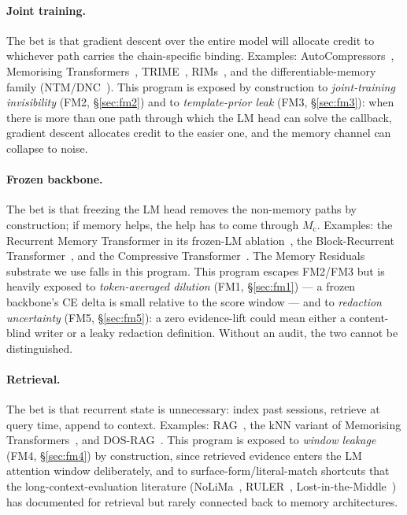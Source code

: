 \documentclass{article}
\newcommand{\Mc}{M_{\mathrm{c}}}
\begin{document}
\paragraph{Joint training.}  The bet is that gradient descent over
the entire model will allocate credit to whichever path carries the
chain-specific binding.  Examples: AutoCompressors~\cite{autocompressors2023},
Memorising Transformers~\cite{memorizing2022}, TRIME~\cite{trime2022},
RIMs~\cite{rims2021}, and the differentiable-memory family
(NTM/DNC~\cite{ntm2014}).  This program is exposed by construction to
\emph{joint-training invisibility} (FM2, \S\ref{sec:fm2}) and to
\emph{template-prior leak} (FM3, \S\ref{sec:fm3}): when there is more
than one path through which the LM head can solve the callback,
gradient descent allocates credit to the easier one, and the memory
channel can collapse to noise.

\paragraph{Frozen backbone.}  The bet is that freezing the LM head
removes the non-memory paths by construction; if memory helps, the
help has to come through $\Mc$.  Examples: the Recurrent Memory
Transformer in its frozen-LM ablation~\cite{rmt2022,armt2024}, the
Block-Recurrent Transformer~\cite{blockrecurrent2022}, and the
Compressive Transformer~\cite{compressive2019}.  The Memory Residuals
substrate we use falls in this program.  This program escapes FM2/FM3
but is heavily exposed to \emph{token-averaged dilution} (FM1,
\S\ref{sec:fm1}) --- a frozen backbone's CE delta is small relative
to the score window --- and to \emph{redaction uncertainty} (FM5,
\S\ref{sec:fm5}): a zero evidence-lift could mean either a
content-blind writer or a leaky redaction definition.  Without an
audit, the two cannot be distinguished.

\paragraph{Retrieval.}  The bet is that recurrent state is
unnecessary: index past sessions, retrieve at query time, append to
context.  Examples: RAG~\cite{ragoriginal2020}, the kNN variant of
Memorising Transformers~\cite{memorizing2022}, and
DOS-RAG~\cite{ragbaseline2025}.  This program is exposed to
\emph{window leakage} (FM4, \S\ref{sec:fm4}) by construction, since
retrieved evidence enters the LM attention window deliberately, and
to surface-form/literal-match shortcuts that the
long-context-evaluation literature
(NoLiMa~\cite{nolima2025}, RULER~\cite{ruler2024},
Lost-in-the-Middle~\cite{lostmiddle2024}) has documented for
retrieval but rarely connected back to memory architectures.
\end{document}
